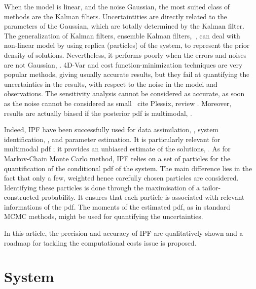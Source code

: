 \documentclass[10pt,openany,onecolumn,a4wide,pof]{article}
\newcommand{\todo}[1]{{\color{red} #1 }}
\begin{document}
When the model is linear, and the noise Gaussian, the most suited class of methods are the Kalman filters. 
Uncertaintities are directly related to the parameters of the Gaussian, which are totally determined by the Kalman filter. 
The generalization of Kalman filters, ensemble Kalman filters,~\cite{Evensen2009}, can deal with non-linear model by using replica (particles) of the system, to represent the prior density of solutions. 
Nevertheless, it performs poorly when the errors and noises are not Gaussian, \cite{Miller1999}. 
4D-Var and cost function-minimization techniques are very popular methods, giving usually accurate results, but they fail at quantifying the uncertainties in the results, with respect to the noise in the model and observations. 
The sensitivity analysis cannot be considered as accurate, as soon as the noise cannot be considered as small~\todo{cite Plessix, review}.
Moreover, results are actually biased if the posterior pdf is multimodal, \cite{Rabier1992}.

Indeed, IPF have been successfully used for data assimilation, \cite{Chorin2010}, system identification, \cite{Morzfeld2012}, and parameter estimation. 
It is particularly relevant for multimodal pdf ; it provides an unbiased estimate of the solutions, \cite{Atkins2013}.
As for Markov-Chain Monte Carlo method, IPF relies on a set of particles for the quantification of the conditional pdf of the system.
The main difference lies in the fact that only a few, weighted hence carefully chosen particles are considered.  
Identifying these particles is done through the maximisation of a tailor-constructed probability.
It ensures that each particle is associated with relevant informations of the pdf. 
The moments of the estimated pdf, as in standard MCMC methods, might be used for quantifying the uncertainties.

In this article, the precision and accuracy of IPF are qualitatively shown
and a roadmap for tackling the computational costs issue is proposed.





%
\section{System}
\label{sec-sys}
\end{document}
